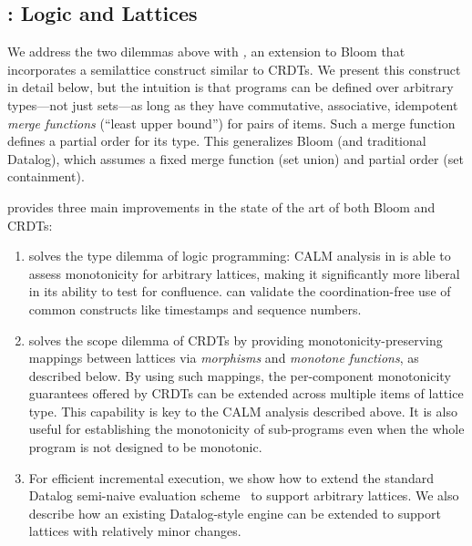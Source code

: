 \subsection{\lang: Logic and Lattices}
We address the two dilemmas above with \emph{\lang,} an extension to Bloom that
incorporates a semilattice construct similar to CRDTs.  We present this construct in detail below, but the intuition is that \lang programs can be defined over arbitrary types---not just sets---as long as they have commutative, associative, idempotent \emph{merge functions} (``least upper bound'') for pairs of items.  Such a merge function defines a partial order  for its type. This
generalizes Bloom (and traditional Datalog), which assumes a fixed merge
function (set union) and partial order (set containment).


\lang provides three main improvements in the state of the art of both Bloom and CRDTs:  
\begin{enumerate}
\item \lang solves the type dilemma of logic programming: CALM analysis in \lang is able to 
 assess monotonicity for arbitrary lattices, making it significantly more liberal in its ability to test for confluence.  \lang can validate the coordination-free use of
  common constructs like timestamps and sequence numbers.

\item {\lang} solves the scope dilemma of CRDTs by providing monotonicity-preserving mappings between lattices via
  \emph{morphisms} and \emph{monotone functions}, as described below.  By using such mappings, the
  per-component monotonicity guarantees offered by CRDTs can be extended across
  multiple items of lattice type.  This capability is key to the CALM
  analysis described above.  It is also useful for
  establishing the monotonicity of sub-programs even when the whole program is
  not designed to be monotonic.

\item For efficient incremental execution, we show how to extend the standard Datalog semi-naive
  evaluation scheme~\cite{Balbin1987} to support arbitrary lattices. We also describe how an existing Datalog-style engine can be
  extended to support lattices with relatively minor changes.
\end{enumerate}

